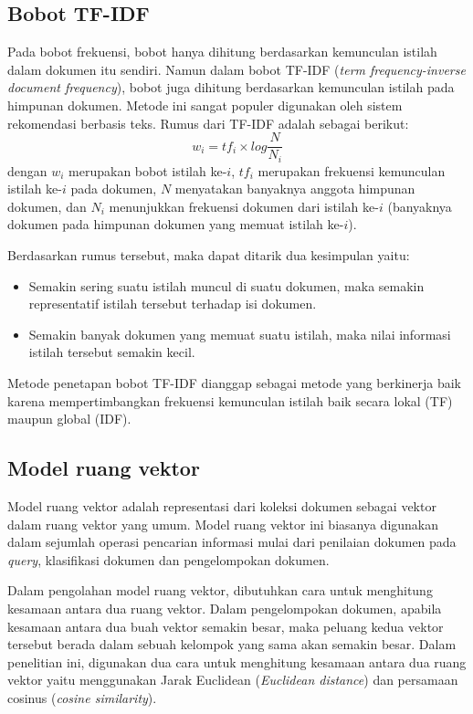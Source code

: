 \subsection{Bobot TF-IDF}
Pada bobot frekuensi, bobot hanya dihitung berdasarkan kemunculan istilah dalam dokumen itu sendiri. Namun dalam bobot TF-IDF (\textit{term frequency-inverse document frequency}), bobot juga dihitung berdasarkan kemunculan istilah pada himpunan dokumen. Metode ini sangat populer digunakan oleh sistem rekomendasi berbasis teks.\cite{aizawa2003information} Rumus dari TF-IDF adalah sebagai berikut: 
\begin{equation}
w_i=tf_i \times log \frac{N}{N_i}
\end{equation}
dengan $w_i$ merupakan bobot istilah ke-$i$, $tf_i$ merupakan frekuensi kemunculan istilah ke-$i$ pada dokumen, $N$ menyatakan banyaknya anggota himpunan dokumen, dan $N_i$ menunjukkan frekuensi dokumen dari istilah ke-$i$ (banyaknya dokumen pada himpunan dokumen yang memuat istilah ke-$i$).

Berdasarkan rumus tersebut, maka dapat ditarik dua kesimpulan yaitu:
\begin{itemize}
\item Semakin sering suatu istilah muncul di suatu dokumen, maka semakin representatif istilah tersebut terhadap isi dokumen.
\item Semakin banyak dokumen yang memuat suatu istilah, maka nilai informasi istilah tersebut semakin kecil.
\end{itemize}

Metode penetapan bobot TF-IDF dianggap sebagai metode yang berkinerja baik karena mempertimbangkan frekuensi kemunculan istilah baik secara lokal (TF) maupun global (IDF).


\subsection{Model ruang vektor}
Model ruang vektor adalah representasi dari koleksi dokumen sebagai vektor dalam ruang vektor yang umum.\cite{schutze2008introduction} Model ruang vektor ini biasanya digunakan dalam sejumlah operasi pencarian informasi mulai dari penilaian dokumen pada \textit{query}, klasifikasi dokumen dan pengelompokan dokumen.

Dalam pengolahan model ruang vektor, dibutuhkan cara untuk menghitung kesamaan antara dua ruang vektor. Dalam pengelompokan dokumen, apabila kesamaan antara dua buah vektor semakin besar, maka peluang kedua vektor tersebut berada dalam sebuah kelompok yang sama akan semakin besar. Dalam penelitian ini, digunakan dua cara untuk menghitung kesamaan antara dua ruang vektor yaitu menggunakan Jarak Euclidean (\textit{Euclidean distance}) dan persamaan cosinus (\textit{cosine similarity}).

